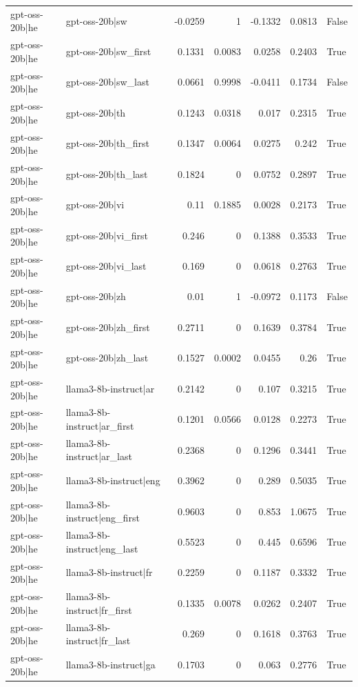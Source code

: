 \begin{table}
\begin{tabular}{l l r r r r l}
gpt-oss-20b|he & gpt-oss-20b|sw & -0.0259 & 1 & -0.1332 & 0.0813 & False \\
gpt-oss-20b|he & gpt-oss-20b|sw_first & 0.1331 & 0.0083 & 0.0258 & 0.2403 & True \\
gpt-oss-20b|he & gpt-oss-20b|sw_last & 0.0661 & 0.9998 & -0.0411 & 0.1734 & False \\
gpt-oss-20b|he & gpt-oss-20b|th & 0.1243 & 0.0318 & 0.017 & 0.2315 & True \\
gpt-oss-20b|he & gpt-oss-20b|th_first & 0.1347 & 0.0064 & 0.0275 & 0.242 & True \\
gpt-oss-20b|he & gpt-oss-20b|th_last & 0.1824 & 0 & 0.0752 & 0.2897 & True \\
gpt-oss-20b|he & gpt-oss-20b|vi & 0.11 & 0.1885 & 0.0028 & 0.2173 & True \\
gpt-oss-20b|he & gpt-oss-20b|vi_first & 0.246 & 0 & 0.1388 & 0.3533 & True \\
gpt-oss-20b|he & gpt-oss-20b|vi_last & 0.169 & 0 & 0.0618 & 0.2763 & True \\
gpt-oss-20b|he & gpt-oss-20b|zh & 0.01 & 1 & -0.0972 & 0.1173 & False \\
gpt-oss-20b|he & gpt-oss-20b|zh_first & 0.2711 & 0 & 0.1639 & 0.3784 & True \\
gpt-oss-20b|he & gpt-oss-20b|zh_last & 0.1527 & 0.0002 & 0.0455 & 0.26 & True \\
gpt-oss-20b|he & llama3-8b-instruct|ar & 0.2142 & 0 & 0.107 & 0.3215 & True \\
gpt-oss-20b|he & llama3-8b-instruct|ar_first & 0.1201 & 0.0566 & 0.0128 & 0.2273 & True \\
gpt-oss-20b|he & llama3-8b-instruct|ar_last & 0.2368 & 0 & 0.1296 & 0.3441 & True \\
gpt-oss-20b|he & llama3-8b-instruct|eng & 0.3962 & 0 & 0.289 & 0.5035 & True \\
gpt-oss-20b|he & llama3-8b-instruct|eng_first & 0.9603 & 0 & 0.853 & 1.0675 & True \\
gpt-oss-20b|he & llama3-8b-instruct|eng_last & 0.5523 & 0 & 0.445 & 0.6596 & True \\
gpt-oss-20b|he & llama3-8b-instruct|fr & 0.2259 & 0 & 0.1187 & 0.3332 & True \\
gpt-oss-20b|he & llama3-8b-instruct|fr_first & 0.1335 & 0.0078 & 0.0262 & 0.2407 & True \\
gpt-oss-20b|he & llama3-8b-instruct|fr_last & 0.269 & 0 & 0.1618 & 0.3763 & True \\
gpt-oss-20b|he & llama3-8b-instruct|ga & 0.1703 & 0 & 0.063 & 0.2776 & True \\

\end{tabular}
\end{table}
